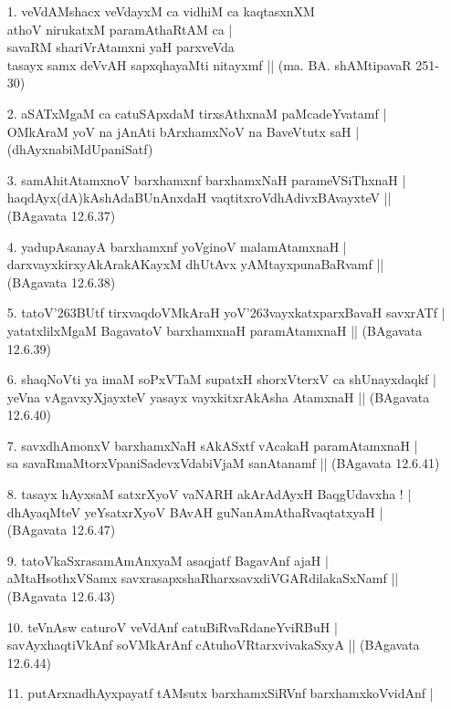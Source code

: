 \begin{itemize}
\item[1.] veVdAMshacx veVdayxM ca vidhiM ca kaqtasxnXM\\
athoV nirukatxM paramAthaRtAM ca |\\
savaRM shariVrAtamxni yaH parxveVda\\
tasayx samx deVvAH sapxqhayaMti nitayxmf ||
\hfill{(ma. BA. shAMtipavaR 251-30)}
\item[2.] aSATxMgaM ca catuSApxdaM tirxsAthxnaM paMcadeYvatamf |\\
OMkAraM yoV na jAnAti bArxhamxNoV na BaveVtutx saH |
\hfill{(dhAyxnabiMdUpaniSatf)}
\item[3.] samAhitAtamxnoV barxhamxnf barxhamxNaH parameVSiThxnaH |\\
haqdAyx(dA)kAshAdaBUnAnxdaH vaqtitxroVdhAdivxBAvayxteV ||
\hfill{(BAgavata 12.6.37)}
\item[4.] yadupAsanayA barxhamxnf yoVginoV malamAtamxnaH |\\
darxvayxkirxyAkArakAKayxM dhUtAvx yAMtayxpunaBaRvamf ||
\hfill{(BAgavata 12.6.38)}
\item[5.] tatoV\char'263BUtf tirxvaqdoVMkAraH yoV\char'263vayxkatxparxBavaH savxrATf |\\
yatatxlilxMgaM BagavatoV barxhamxnaH paramAtamxnaH ||
\hfill{(BAgavata 12.6.39)}
\item[6.] shaqNoVti ya imaM soPxVTaM supatxH shorxVterxV ca shUnayxdaqkf |\\
yeVna vAgavxyXjayxteV yasayx vayxkitxrAkAsha AtamxnaH ||
\hfill{(BAgavata 12.6.40)}
\item[7.] savxdhAmonxV barxhamxNaH sAkASxtf vAcakaH paramAtamxnaH |\\
sa savaRmaMtorxVpaniSadevxVdabiVjaM sanAtanamf ||
\hfill{(BAgavata 12.6.41)}
\item[8.] tasayx hAyxsaM satxrXyoV vaNARH akArAdAyxH BaqgUdavxha ! |\\
dhAyaqMteV yeYsatxrXyoV BAvAH guNanAmAthaRvaqtatxyaH |
\hfil{(BAgavata 12.6.47)}
\item[9.] tatoVkaSxrasamAmAnxyaM asaqjatf BagavAnf ajaH |\\
aMtaHsothxVSamx savxrasapxshaRharxsavxdiVGARdilakaSxNamf ||
\hfill{(BAgavata 12.6.43)}
\item[10.] teVnAsw caturoV veVdAnf catuBiRvaRdaneYviRBuH |\\
savAyxhaqtiVkAnf soVMkArAnf cAtuhoVRtarxvivakaSxyA ||
\hfill{(BAgavata 12.6.44)}
\item[11.] putArxnadhAyxpayatf tAMsutx barxhamxSiRVnf barxhamxkoVvidAnf |\\

\end{itemize}
